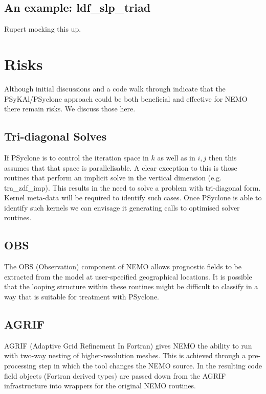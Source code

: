 \documentclass{article}
\newcommand{\psykal}{{PS}y{KA}l}
\begin{document}
\subsection{An example: ldf\_slp\_triad}

Rupert mocking this up.

\section{Risks}

Although initial discussions and a code walk through indicate that the
\psykal/PSyclone approach could be both beneficial and effective for
NEMO there remain risks. We discuss those here.

\subsection{Tri-diagonal Solves}

If PSyclone is to control the iteration space in $k$ as well as in $i,
j$ then this assumes that that space is parallelisable. A clear
exception to this is those routines that perform an implicit solve in
the vertical dimension (e.g. tra\_zdf\_imp). This results in the need
to solve a problem with tri-diagonal form. Kernel meta-data will be
required to identify such cases. Once PSyclone is able to identify
such kernels we can envisage it generating calls to optimised solver
routines.

\subsection{OBS}

The OBS (Observation) component of NEMO allows prognostic fields to be
extracted from the model at user-specified geographical locations.  It
is possible that the looping structure within these routines might be
difficult to classify in a way that is suitable for treatment with
PSyclone.

\subsection{AGRIF}

AGRIF (Adaptive Grid Refinement In Fortran) gives NEMO the ability to
run with two-way nesting of higher-resolution meshes. This is achieved
through a pre-processing step in which the tool changes the NEMO
source. In the resulting code field objects (Fortran derived types)
are passed down from the AGRIF infrastructure into wrappers for the
original NEMO routines.
\end{document}
